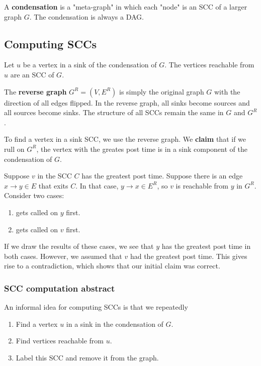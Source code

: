 \documentclass[titlepage, 12pt, leqno]{article}
\begin{document}
\begin{definition}
    A \textbf{condensation} is a "meta-graph" in which each "node" is an SCC
    of a larger graph $G$. The condensation is always a DAG.
\end{definition}

\subsection{Computing SCCs}
Let $u$ be a vertex in a sink of the condensation of $G$. The vertices
reachable from $u$ are an SCC of $G$.

\begin{definition}
The \textbf{reverse graph} $G^{R}=(V,E^{R})$ is simply the original graph $G$
with the direction of all edges flipped. In the reverse graph, all sinks become
sources and all sources become sinks. The structure of all SCCs remain the same
in $G$ and $G^{R}$.
\end{definition}

To find a vertex in a sink SCC, we use the reverse graph. We \textbf{claim} that
if we rull  on $G^{R}$, the vertex with the greates post time is
in a sink component of the condensation of $G$. 

Suppose $v$ in the SCC $C$ has the greatest post time. Suppose there is an edge
$x \rightarrow y \in E$ that exits $C$. In that case, $y \rightarrow x \in 
E^{R}$, so $v$ is reachable from $y$ in $G^{R}$. Consider two cases:
\begin{enumerate}
    \item {} gets called on $y$ first.
    \item {} gets called on $v$ first.
\end{enumerate}
If we draw the results of these cases, we see that $y$ has the greatest post 
time in both cases. However, we assumed that $v$ had the greatest post time. 
This gives rise to a contradiction, which shows that our initial claim was
correct.

\subsubsection{SCC computation abstract}
An informal idea for computing SCCs is that we repeatedly
\begin{enumerate}
    \item Find a vertex $u$ in a sink in the condensation of $G$.
    \item Find vertices reachable from $u$.
    \item Label this SCC and remove it from the graph.
\end{enumerate}
\end{document}
